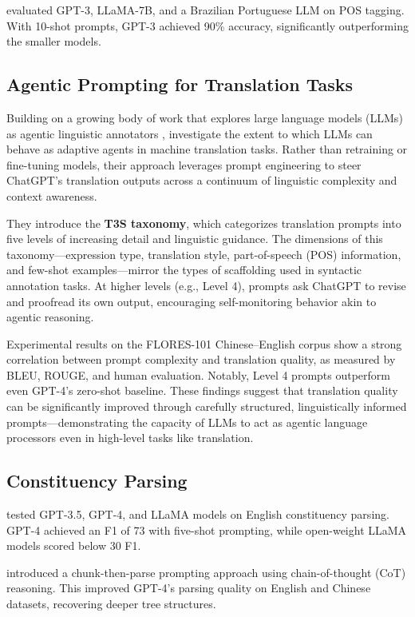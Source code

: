 \citet{machado2024portpos} evaluated GPT-3, LLaMA-7B, and a Brazilian Portuguese LLM on POS tagging. With 10-shot prompts, GPT-3 achieved 90\% accuracy, significantly outperforming the smaller models.

\subsection{Agentic Prompting for Translation Tasks}

Building on a growing body of work that explores large language models (LLMs) as agentic linguistic annotators \citep[e.g.,][]{lai2023chatgptpos, blevins2023llmpos}, \citet{jiao2024gradable} investigate the extent to which LLMs can behave as adaptive agents in machine translation tasks. Rather than retraining or fine-tuning models, their approach leverages prompt engineering to steer ChatGPT's translation outputs across a continuum of linguistic complexity and context awareness.

They introduce the \textbf{T3S taxonomy}, which categorizes translation prompts into five levels of increasing detail and linguistic guidance. The dimensions of this taxonomy—expression type, translation style, part-of-speech (POS) information, and few-shot examples—mirror the types of scaffolding used in syntactic annotation tasks. At higher levels (e.g., Level 4), prompts ask ChatGPT to revise and proofread its own output, encouraging self-monitoring behavior akin to agentic reasoning.

Experimental results on the FLORES-101 Chinese--English corpus show a strong correlation between prompt complexity and translation quality, as measured by BLEU, ROUGE, and human evaluation. Notably, Level 4 prompts outperform even GPT-4's zero-shot baseline. These findings suggest that translation quality can be significantly improved through carefully structured, linguistically informed prompts—demonstrating the capacity of LLMs to act as agentic language processors even in high-level tasks like translation.

\subsection{Constituency Parsing}

\citet{bai2023llmconst} tested GPT-3.5, GPT-4, and LLaMA models on English constituency parsing. GPT-4 achieved an F1 of 73 with five-shot prompting, while open-weight LLaMA models scored below 30 F1.

\citet{tian2024chunkprompt} introduced a chunk-then-parse prompting approach using chain-of-thought (CoT) reasoning. This improved GPT-4's parsing quality on English and Chinese datasets, recovering deeper tree structures.

